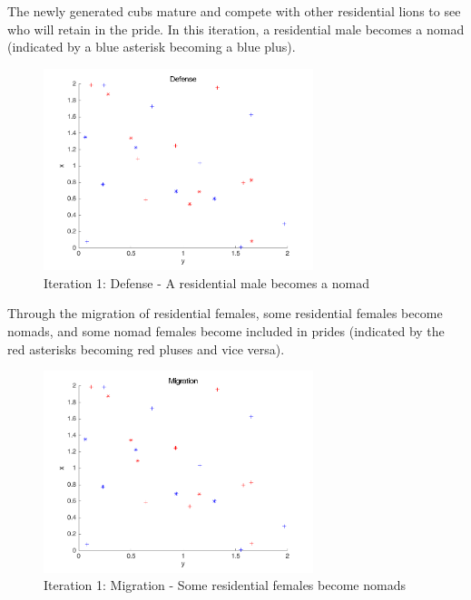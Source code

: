 The newly generated cubs mature and compete with other residential lions to see who will retain in the pride. In this iteration, a residential male becomes a nomad (indicated by a blue asterisk becoming a blue plus).

\begin{figure}[H]
\begin{center}
\includegraphics[width=0.7\textwidth]{img/mdme/defense1}
\caption{Iteration 1: Defense - A residential male becomes a nomad}
\end{center}
\end{figure}

Through the migration of residential females, some residential females become nomads, and some nomad females become included in prides (indicated by the red asterisks becoming red pluses and vice versa).

\begin{figure}[H]
\begin{center}
\includegraphics[width=0.7\textwidth]{img/mdme/migration1}
\caption{Iteration 1: Migration - Some residential females become nomads}
\end{center}
\end{figure}

